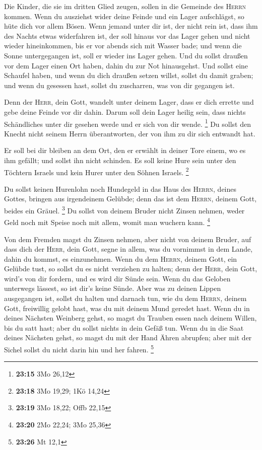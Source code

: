  Die Kinder, die sie im dritten Glied zeugen, sollen in
die Gemeinde des \textsc{Herrn} kommen.  Wenn du
ausziehst wider deine Feinde und ein Lager aufschlägst, so hüte dich vor
allem Bösen.  Wenn jemand unter dir ist, der nicht rein
ist, dass ihm des Nachts etwas widerfahren ist, der soll hinaus vor das
Lager gehen und nicht wieder hineinkommen,  bis er vor
abends sich mit Wasser bade; und wenn die Sonne untergegangen ist, soll
er wieder ins Lager gehen.  Und du sollst draußen vor dem
Lager einen Ort haben, dahin du zur Not hinausgehst.  Und
sollst eine Schaufel haben, und wenn du dich draußen setzen willst,
sollst du damit graben; und wenn du gesessen hast, sollst du zuscharren,
was von dir gegangen ist.

 Denn der \textsc{Herr}, dein Gott, wandelt unter deinem
Lager, dass er dich errette und gebe deine Feinde vor dir dahin. Darum
soll dein Lager heilig sein, dass nichts Schändliches unter dir gesehen
werde und er sich von dir wende. \footnote{\textbf{23:15} 3Mo 26,12}
 Du sollst den Knecht nicht seinem Herrn überantworten,
der von ihm zu dir sich entwandt hat.

 Er soll bei dir bleiben an dem Ort, den er erwählt in
deiner Tore einem, wo es ihm gefällt; und sollst ihn nicht schinden.
 Es soll keine Hure sein unter den Töchtern Israels und
kein Hurer unter den Söhnen Israels. \footnote{\textbf{23:18} 3Mo 19,29;
  1Kö 14,24}

 Du sollst keinen Hurenlohn noch Hundegeld in das Haus
des \textsc{Herrn}, deines Gottes, bringen aus irgendeinem Gelübde; denn
das ist dem \textsc{Herrn}, deinem Gott, beides ein Gräuel. \footnote{\textbf{23:19}
  3Mo 18,22; Offb 22,15}  Du sollst von deinem Bruder
nicht Zinsen nehmen, weder Geld noch mit Speise noch mit allem, womit
man wuchern kann. \footnote{\textbf{23:20} 2Mo 22,24; 3Mo 25,36}

 Von dem Fremden magst du Zinsen nehmen, aber nicht von
deinem Bruder, auf dass dich der \textsc{Herr}, dein Gott, segne in
allem, was du vornimmst in dem Lande, dahin du kommst, es einzunehmen.
 Wenn du dem \textsc{Herrn}, deinem Gott, ein Gelübde
tust, so sollst du es nicht verziehen zu halten; denn der \textsc{Herr},
dein Gott, wird's von dir fordern, und es wird dir Sünde sein.
 Wenn du das Geloben unterwegs lässest, so ist dir's
keine Sünde.  Aber was zu deinen Lippen ausgegangen ist,
sollst du halten und darnach tun, wie du dem \textsc{Herrn}, deinem
Gott, freiwillig gelobt hast, was du mit deinem Mund geredet hast.
 Wenn du in deines Nächsten Weinberg gehst, so magst du
Trauben essen nach deinem Willen, bis du satt hast; aber du sollst
nichts in dein Gefäß tun.  Wenn du in die Saat deines
Nächsten gehst, so magst du mit der Hand Ähren abrupfen; aber mit der
Sichel sollst du nicht darin hin und her fahren. \footnote{\textbf{23:26}
  Mt 12,1}

